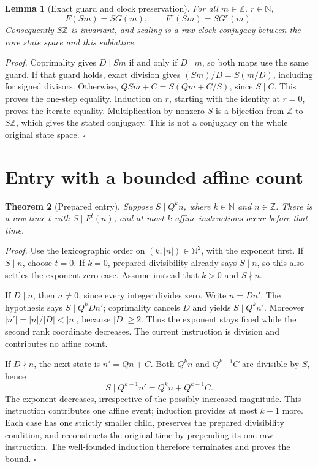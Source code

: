 \documentclass[11pt,letterpaper]{article}
\newcommand{\N}{\mathbb{N}}
\newcommand{\Z}{\mathbb{Z}}
\newtheorem{theorem}{Theorem}
\newtheorem{lemma}[theorem]{Lemma}
\newenvironment{proof}{\noindent\textit{Proof.}}{\hfill\(\square\)}
\begin{document}
\begin{lemma}[Exact guard and clock preservation]
\label{lem:scale}
For all \(m\in\Z\), \(r\in\N\),
\[
F(Sm)=S G(m),\qquad F^r(Sm)=S G^r(m).
\]
Consequently \(S\Z\) is invariant, and scaling is a raw-clock conjugacy
between the core state space and this sublattice.
\end{lemma}
\begin{proof}
Coprimality gives \(D\mid Sm\) if and only if \(D\mid m\), so both maps
use the same guard. If that guard holds, exact division gives
\((Sm)/D=S(m/D)\), including for signed divisors. Otherwise,
\(QSm+C=S(Qm+C/S)\), since \(S\mid C\).
This proves the one-step equality. Induction on \(r\), starting with the
identity at \(r=0\), proves the iterate equality. Multiplication by nonzero
\(S\) is a bijection from \(\Z\) to \(S\Z\), which gives the stated
conjugacy. This is not a conjugacy on the whole original state space.
\end{proof}

\section{Entry with a bounded affine count}

\begin{theorem}[Prepared entry]
\label{thm:entry}
Suppose \(S\mid Q^k n\), where \(k\in\N\) and \(n\in\Z\).
There is a raw time \(t\) with \(S\mid F^t(n)\), and at most \(k\)
affine instructions occur before that time.
\end{theorem}
\begin{proof}
Use the lexicographic order on \((k,|n|)\in\N^2\), with the exponent
first. If \(S\mid n\), choose \(t=0\). If \(k=0\), prepared divisibility
already says \(S\mid n\), so this also settles the exponent-zero case.
Assume instead that \(k>0\) and \(S\nmid n\).

If \(D\mid n\), then \(n\ne0\), since every integer divides zero.
Write \(n=Dn'\). The hypothesis says \(S\mid Q^k Dn'\);
coprimality cancels \(D\) and yields \(S\mid Q^k n'\).
Moreover \(|n'|=|n|/|D|<|n|\), because \(|D|\ge2\).
Thus the exponent stays fixed while the second rank coordinate decreases.
The current instruction is division and contributes no affine count.

If \(D\nmid n\), the next state is \(n'=Qn+C\). Both
\(Q^k n\) and \(Q^{k-1}C\) are divisible by \(S\), hence
\[
S\mid Q^{k-1}n'=Q^k n+Q^{k-1}C.
\]
The exponent decreases, irrespective of the possibly increased magnitude.
This instruction contributes one affine event; induction provides at most
\(k-1\) more. Each case has one strictly smaller child, preserves the
prepared divisibility condition, and reconstructs the original time by
prepending its one raw instruction. The well-founded induction therefore
terminates and proves the bound.
\end{proof}
\end{document}
